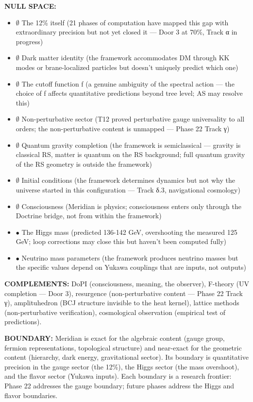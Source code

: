 \textbf{NULL SPACE:}

\begin{itemize}[nosep,leftmargin=*]
  \item $\emptyset$ The 12\% itself (21 phases of computation have mapped this gap with extraordinary precision but not yet closed it — Door 3 at 70\%, Track α in progress)
  \item $\emptyset$ Dark matter identity (the framework accommodates DM through KK modes or brane-localized particles but doesn't uniquely predict which one)
  \item $\emptyset$ The cutoff function f (a genuine ambiguity of the spectral action — the choice of f affects quantitative predictions beyond tree level; AS may resolve this)
  \item $\emptyset$ Non-perturbative sector (T12 proved perturbative gauge universality to all orders; the non-perturbative content is unmapped — Phase 22 Track γ)
  \item $\emptyset$ Quantum gravity completion (the framework is semiclassical — gravity is classical RS, matter is quantum on the RS background; full quantum gravity of the RS geometry is outside the framework)
  \item $\emptyset$ Initial conditions (the framework determines dynamics but not why the universe started in this configuration — Track δ.3, navigational cosmology)
  \item $\emptyset$ Consciousness (Meridian is physics; consciousness enters only through the Doctrine bridge, not from within the framework)
  \item $\bullet$ The Higgs mass (predicted 136-142 GeV, overshooting the measured 125 GeV; loop corrections may close this but haven't been computed fully)
  \item $\bullet$ Neutrino mass parameters (the framework produces neutrino masses but the specific values depend on Yukawa couplings that are inputs, not outputs)
\end{itemize}


\textbf{COMPLEMENTS:} DoPI (consciousness, meaning, the observer), F-theory (UV completion — Door 3), resurgence (non-perturbative content — Phase 22 Track γ), amplituhedron (BCJ structure invisible to the heat kernel), lattice methods (non-perturbative verification), cosmological observation (empirical test of predictions).


\textbf{BOUNDARY:} Meridian is exact for the algebraic content (gauge group, fermion representations, topological structure) and near-exact for the geometric content (hierarchy, dark energy, gravitational sector). Its boundary is quantitative precision in the gauge sector (the 12\%), the Higgs sector (the mass overshoot), and the flavor sector (Yukawa inputs). Each boundary is a research frontier: Phase 22 addresses the gauge boundary; future phases address the Higgs and flavor boundaries.


